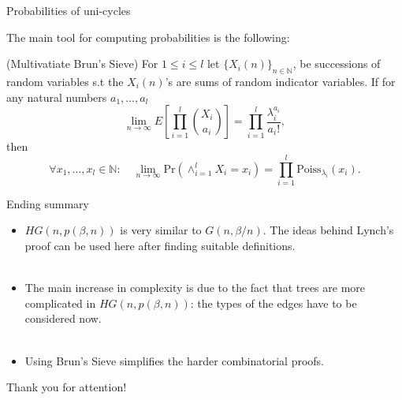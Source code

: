 \documentclass[11pt]{beamer}
\newcommand{\N}{\mathbb{N}}
\newcommand{\Ln}{\lim\limits_{n\to \infty}}
\begin{document}
	\begin{frame}{Probabilities of uni-cycles}
	
	The main tool for computing probabilities is the following:
	
		\begin{theorem}{(Multivatiate Brun's Sieve)}
			For $1\leq i \leq l$ let $\{X_i(n)\}_{n\in \N}$,  be successions of 
			random variables s.t the $X_i(n)$'s are sums of random indicator variables.
			If for any natural numbers $a_1,\dots, a_l$
			\[ \Ln E\left[\prod_{i=1}^l \binom{X_i}{a_i} \right] = 
			\prod_{i=1}^l \frac{\lambda_i^{a_i}}{a_i!}, \]
			then
			\[ \forall x_1,\dots, x_l\in \N: \quad \Ln \mathrm{Pr}(\wedge_{i=1}^l
			X_i=x_i)= \prod_{i=1}^l \mathrm{Poiss}_{\lambda_i}(x_i).\]
			
		\end{theorem}
	
	\end{frame}

	\begin{frame}{Ending summary}
		\begin{itemize}
			\item $HG(n,p(\beta,n))$ is very similar to $G(n,\beta/n)$. The ideas behind Lynch's proof
			can be used here after finding suitable definitions. 
			\\~\\
			\item The main increase in complexity is due to the fact that trees are more complicated in $HG(n,p(\beta,n))$:
			the types of the edges have to be considered now. 
			\\~\\
			\item Using Brun's Sieve simplifies the harder combinatorial proofs.  
		\end{itemize}
	\vfill
	\pause
	{\hfill \Large Thank you for attention!}
 	\end{frame}


	
\end{document}
